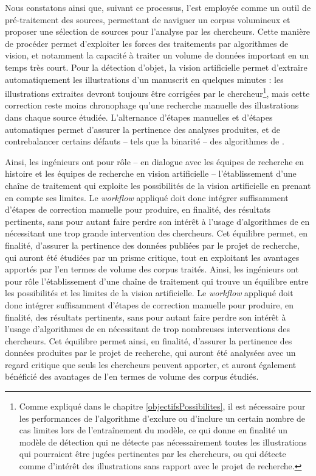 	Nous constatons ainsi que, suivant ce processus, l'\ia est employée comme un outil de pré-traitement des sources, permettant de naviguer un corpus volumineux et proposer une sélection de sources pour l'analyse par les chercheurs. Cette manière de procéder permet d'exploiter les forces des traitements par algorithmes de vision, et notamment la capacité à traiter un volume de données important en un temps très court. Pour la détection d'objet, la vision artificielle permet d'extraire automatiquement les illustrations d'un manuscrit en quelques minutes : les illustrations extraites devront toujours être corrigées par le chercheur\footnote{Comme expliqué dans le chapitre \ref{objectifsPossibilites}, il est nécessaire pour les performances de l'algorithme d'exclure ou d'inclure un certain nombre de cas limites lors de l'entraînement du modèle, ce qui donne en finalité un modèle de détection qui ne détecte pas nécessairement toutes les illustrations qui pourraient être jugées pertinentes par les chercheurs, ou qui détecte comme d'intérêt des illustrations sans rapport avec le projet de recherche.}, mais cette correction reste moins chronophage qu'une recherche manuelle des illustrations dans chaque source étudiée. L'alternance d'étapes manuelles et d'étapes automatiques permet d'assurer la pertinence des analyses produites, et de contrebalancer certains défauts -- tels que la binarité -- des algorithmes de \cv.
	
	Ainsi, les ingénieurs ont pour rôle -- en dialogue avec les équipes de recherche en histoire et les équipes de recherche en vision artificielle -- l'établissement d'une chaîne de traitement qui exploite les possibilités de la vision artificielle en prenant en compte ses limites. Le \textit{workflow} appliqué doit donc intégrer suffisamment d'étapes de correction manuelle pour produire, en finalité, des résultats pertinents, sans pour autant faire perdre son intérêt à l'usage d'algorithmes de \cv en nécessitant une trop grande intervention des chercheurs. Cet équilibre permet, en finalité, d'assurer la pertinence des données publiées par le projet de recherche, qui auront été étudiées par un prisme critique, tout en exploitant les avantages apportés par l'\ia en termes de volume des corpus traités.
	Ainsi, les ingénieurs ont pour rôle l'établissement d'une chaîne de traitement qui trouve un équilibre entre les possibilités et les limites de la vision artificielle. Le \textit{workflow} appliqué doit donc intégrer suffisamment d'étapes de correction manuelle pour produire, en finalité, des résultats pertinents, sans pour autant faire perdre son intérêt à l'usage d'algorithmes de \cv en nécessitant de trop nombreuses interventions des chercheurs. Cet équilibre permet ainsi, en finalité, d'assurer la pertinence des données produites par le projet de recherche, qui auront été analysées avec un regard critique que seuls les chercheurs peuvent apporter, et auront également bénéficié des avantages de l'\ia en termes de volume des corpus étudiés. 
	
